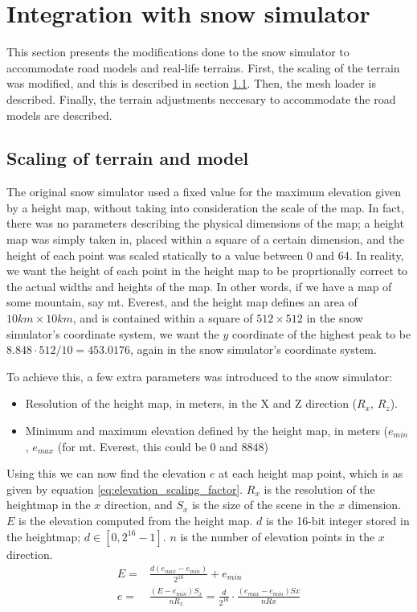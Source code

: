 \section{Integration with snow simulator}
\label{sec:impl_snowsim}
This section presents the modifications done to the snow simulator to accommodate road models and real-life terrains. First, the scaling of the terrain was modified, and this is described in section \ref{sec:terrain_scaling}. Then, the mesh loader is described. Finally, the terrain adjustments neccesary to accommodate the road models are described.

\subsection{Scaling of terrain and model}
\label{sec:terrain_scaling}
The original snow simulator used a fixed value for the maximum elevation given by a height map, without taking into consideration the scale of the map. In fact, there was no parameters describing the physical dimensions of the map; a height map was simply taken in, placed within a square of a certain dimension, and the height of each point was scaled statically to a value between 0 and 64. In reality, we want the height of each point in the height map to be proprtionally correct to the actual widths and heights of the map. In other words, if we have a map of some mountain, say mt. Everest, and the height map defines an area of $10km\times 10km$, and is contained within a square of $512\times 512$ in the snow simulator's coordinate system, we want the $y$ coordinate of the highest peak to be $8.848\cdot 512/10 = 453.0176$, again in the snow simulator's coordinate system.

To achieve this, a few extra parameters was introduced to the snow simulator:
\begin{itemize}
\item Resolution of the height map, in meters, in the X and Z direction ($R_x$, $R_z$).
\item Minimum and maximum elevation defined by the height map, in meters ($e_{min}$, $e_{max}$ (for mt. Everest, this could be $0$ and $8848$)
\end{itemize}
Using this we can now find the elevation $e$ at each height map point, which is as given by equation \ref{eq:elevation_scaling_factor}. $R_x$ is the resolution of the heightmap in the $x$ direction, and $S_x$ is the size of the scene in the $x$ dimension. $E$ is the elevation computed from the height map. $d$ is the 16-bit integer stored in the heightmap; $d\in [0,2^{16}-1]$. $n$ is the number of elevation points in the $x$ direction.
\begin{align}
E =& \frac{d(e_{max}-e_{min})}{2^{16}}+e_{min}\\
e =& \frac{(E-e_{min})S_x}{nR_x} = \frac{d}{2^{16}}\cdot \frac{(e_{max}-e_{min})Sx}{nRx} \label{eq:elevation_scaling_factor}
\end{align}

